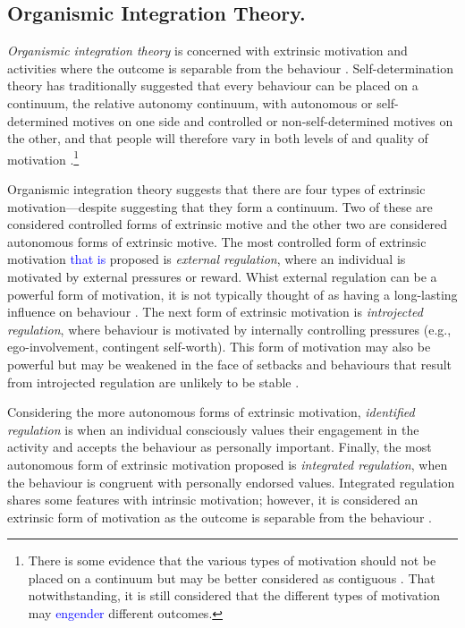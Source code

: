 \documentclass[
  12pt,
  a4paper,
]{book}
\begin{document}
\hypertarget{organismic-integration-theory.}{%
\subsection{Organismic Integration Theory.}\label{organismic-integration-theory.}}

\emph{Organismic integration theory} is concerned with extrinsic motivation and activities where the outcome is separable from the behaviour \citep{Ryan1985}. Self-determination theory has traditionally suggested that every behaviour can be placed on a continuum, the relative autonomy continuum, with autonomous or self-determined motives on one side and controlled or non-self-determined motives on the other, and that people will therefore vary in both levels of and quality of motivation \citep{Deci1985b, Sheldon2019}.\footnote{There is some evidence that the various types of motivation should not be placed on a continuum but may be better considered as contiguous \citep{Chemolli2014}. That notwithstanding, it is still considered that the different types of motivation may \textcolor{blue}{engender} different outcomes.}

Organismic integration theory suggests that there are four types of extrinsic motivation---despite suggesting that they form a continuum. Two of these are considered controlled forms of extrinsic motive and the other two are considered autonomous forms of extrinsic motive. The most controlled form of extrinsic motivation \textcolor{blue}{that is} proposed is \emph{external regulation}, where an individual is motivated by external pressures or reward. Whist external regulation can be a powerful form of motivation, it is not typically thought of as having a long-lasting influence on behaviour \citep{Ryan2000c}. The next form of extrinsic motivation is \emph{introjected regulation}, where behaviour is motivated by internally controlling pressures (e.g., ego-involvement, contingent self-worth). This form of motivation may also be powerful but may be weakened in the face of setbacks and behaviours that result from introjected regulation are unlikely to be stable \citep{Deci1995, Ryan2019}.

Considering the more autonomous forms of extrinsic motivation, \emph{identified regulation} is when an individual consciously values their engagement in the activity and accepts the behaviour as personally important. Finally, the most autonomous form of extrinsic motivation proposed is \emph{integrated regulation}, when the behaviour is congruent with personally endorsed values. Integrated regulation shares some features with intrinsic motivation; however, it is considered an extrinsic form of motivation as the outcome is separable from the behaviour \citep{Ryan2002}.
\end{document}

